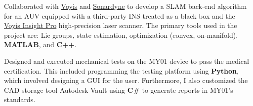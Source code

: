 \documentclass[10pt,letter]{altacv}
\begin{document}
\divider

Collaborated with \href{https://voyis.com/}{Voyis} and \href{https://www.sonardyne.com/}{Sonardyne} to develop a SLAM back-end algorithm for an AUV equipped with a third-party INS treated as a black box and the \href{https://voyis.com/insight-pro}{Voyis Insight Pro} high-precision laser scanner.
The primary tools used in the project are:
Lie groups, state estimation, optimization (convex, on-manifold), \textbf{MATLAB}, and \textbf{C++}.

\divider

Designed and executed mechanical tests on the MY01 device to pass the medical certification.
This included programming the testing platform using \textbf{Python}, which involved designing a GUI for the user.
Furthermore, I also customized the CAD storage tool Autodesk Vault using \textbf{C\#} to generate reports in MY01's standards.




\end{document}
